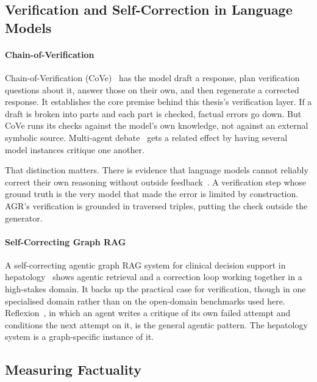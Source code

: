 \subsection{Verification and Self-Correction in Language
Models}\label{sec:verification-related}

\paragraph{Chain-of-Verification}

Chain-of-Verification (CoVe)~\cite{dhuliawala2024chain} has the model draft a
response, plan verification questions about it, answer those on their own, and
then regenerate a corrected response. It establishes the core premise behind
this thesis's verification layer. If a draft is broken into parts and each part
is checked, factual errors go down. But CoVe runs its checks against the model's
own knowledge, not against an external symbolic source. Multi-agent
debate~\cite{du2024improving} gets a related effect by having several model
instances critique one another.

That distinction matters. There is evidence that language models cannot reliably
correct their own reasoning without outside
feedback~\cite{huang2024selfcorrect}. A verification step whose ground truth is
the very model that made the error is limited by construction. AGR's
verification is grounded in traversed triples, putting the check outside the
generator.

\paragraph{Self-Correcting Graph RAG}

A self-correcting agentic graph RAG system for clinical decision support in
hepatology~\cite{hu2025selfcorrecting} shows agentic retrieval and a correction
loop working together in a high-stakes domain. It backs up the practical case
for verification, though in one specialised domain rather than on the
open-domain benchmarks used here. Reflexion~\cite{shinn2023reflexion}, in which
an agent writes a critique of its own failed attempt and conditions the next
attempt on it, is the general agentic pattern. The hepatology system is a
graph-specific instance of it.

\subsection{Measuring Factuality}\label{sec:factuality-related}

